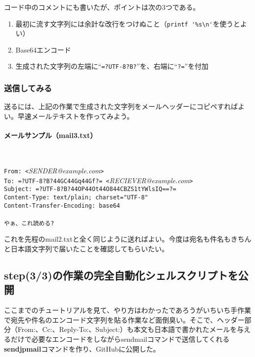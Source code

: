 コード中のコメントにも書いたが、ポイントは次の3つである。
\begin{enumerate}
  \item 最初に流す文字列には余計な改行をつけぬこと（\verb|printf '%s\n'|を使うとよい）
  \item Base64エンコード
  \item 生成された文字列の左端に``\verb|=?UTF-8?B?|''を、右端に``\verb|?=|''を付加
\end{enumerate}

\subsubsection*{送信してみる}

送るには、上記の作業で生成された文字列をメールヘッダーにコピペすればよい。早速メールテキストを作ってみよう。

\paragraph{メールサンプル（mail3.txt）}　\\
\begin{frameboxit}{160.0mm}
	\verb|From: <|\textit{SENDER@example.com}\verb|>| \\
	\verb|To: =?UTF-8?B?44GC44Gq44Gf?= <|\textit{RECIEVER@example.com}\verb|>| \\
	\verb|Subject: =?UTF-8?B?44OP44Ot44O844CBZS1tYWlsIQ==?=| \\
	\verb|Content-Type: text/plain; charset="UTF-8"| \\
	\verb|Content-Transfer-Encoding: base64| \\
	\verb|| \\
	\verb|やぁ、これ読める?|
\end{frameboxit}

これを先程のmail2.txtと全く同じように送ればよい。今度は宛名も件名もきちんと日本語文字列で届いたことを確認してもらいたい。

\subsection*{step(3/3)の作業の完全自動化シェルスクリプトを公開}

ここまでのチュートリアルを見て、やり方はわかったであろうがいちいち手作業で宛先や件名のエンコード文字列を貼る作業など面倒臭い。そこで、ヘッダー部分（From:、Cc:、Reply-To:、Subject:）も本文も日本語で書かれたメールを与えるだけで必要なエンコードをしながらsendmailコマンドで送信してくれる\textbf{sendjpmail}コマンドを作り、GitHubに公開した。

